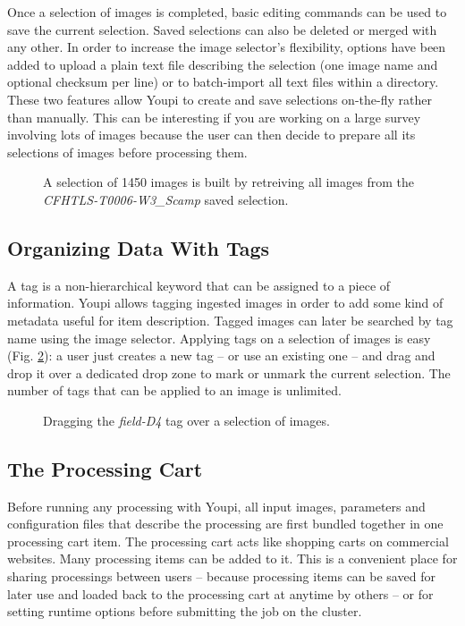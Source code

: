 \documentclass[11pt,twoside]{article}  %
\begin{document}
Once a selection of images is completed, basic editing commands can be used to save the current 
selection. Saved selections can also be deleted or merged with any other. In order to increase the 
image selector's flexibility, options have been added to upload a plain text file describing the 
selection (one image name and optional checksum per line) or to batch-import all text files within 
a directory. These two features allow Youpi to create and save selections on-the-fly rather than 
manually. This can be interesting if you are working on a large survey involving lots of images 
because the user can then decide to prepare all its selections of images before processing them.

\begin{figure}[h]
\caption{A selection of 1450 images is built by retreiving all images from the 
\emph{CFHTLS-T0006-W3\_Scamp} saved selection.}\label{fig:ims}
\end{figure}

\subsection{Organizing Data With Tags}

A tag is a non-hierarchical keyword that can be assigned to a piece of information. Youpi allows 
tagging ingested images in order to add some kind of metadata useful for item description. Tagged 
images can later be searched by tag name using the image selector. Applying tags on a selection of 
images is easy (Fig. \ref{fig:tags}): a user just creates a new tag -- or use an existing one -- and 
drag and drop it over a dedicated drop zone to mark or unmark the current selection. The number 
of tags that can be applied to an image is unlimited.

\begin{figure}[h]
\caption{Dragging the \emph{field-D4} tag over a selection of images.}\label{fig:tags}
\end{figure}

\subsection{The Processing Cart}

Before running any processing with Youpi, all input images, parameters and configuration files 
that describe the processing are first bundled together in one processing cart item. The 
processing cart acts like shopping carts on commercial websites. Many processing items can be 
added to it. This is a convenient place for sharing processings between users -- because processing 
items can be saved for later use and loaded back to the processing cart at anytime by others -- or 
for setting runtime options before submitting the job on the cluster.
\end{document}
